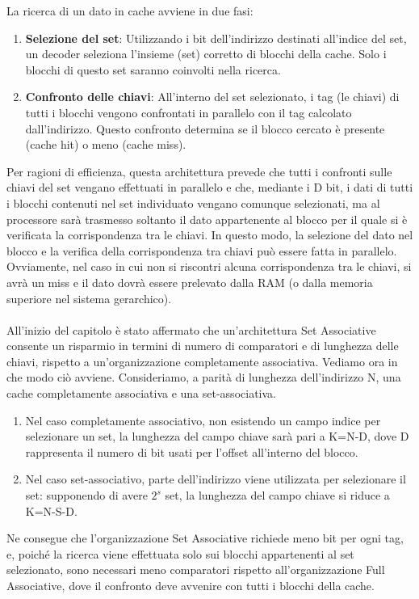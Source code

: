 La ricerca di un dato in cache avviene in due fasi: 
\begin{enumerate}
    \item \textbf{Selezione del set}: Utilizzando i bit dell'indirizzo destinati all'indice del set, un decoder seleziona l’insieme (set) corretto di blocchi della cache. Solo i blocchi di questo set saranno coinvolti nella ricerca. 
    \item \textbf{Confronto delle chiavi}: All'interno del set selezionato, i tag (le chiavi) di tutti i blocchi vengono confrontati in parallelo con il tag calcolato dall’indirizzo. Questo confronto determina se il blocco cercato è presente (cache hit) o meno (cache miss).
\end{enumerate}
Per ragioni di efficienza, questa architettura prevede che tutti i confronti sulle chiavi del set vengano effettuati in parallelo e che, mediante i D bit, i dati di tutti i blocchi contenuti nel set individuato vengano comunque selezionati, ma al processore sarà trasmesso soltanto il dato appartenente al blocco per il quale si è verificata la corrispondenza tra le chiavi. In questo modo, la selezione del dato nel blocco e la verifica della corrispondenza tra chiavi può essere fatta in parallelo. Ovviamente, nel caso in cui non si riscontri alcuna corrispondenza tra le chiavi, si avrà un miss e il dato dovrà essere prelevato dalla RAM (o dalla memoria superiore nel sistema gerarchico).
\\
\\
All'inizio del capitolo è stato affermato che un'architettura Set Associative consente un risparmio in termini di numero di comparatori e di lunghezza delle chiavi, rispetto a un'organizzazione completamente associativa. Vediamo ora in che modo ciò avviene. Consideriamo, a parità di lunghezza dell'indirizzo N, una cache completamente associativa e una set-associativa. 
\begin{enumerate}
    \item Nel caso completamente associativo, non esistendo un campo indice per selezionare un set, la lunghezza del campo chiave sarà pari a K=N-D, dove D rappresenta il numero di bit usati per l'offset all'interno del blocco.
    \item Nel caso set-associativo, parte dell'indirizzo viene utilizzata per selezionare il set: supponendo di avere \(2^s\) set, la lunghezza del campo chiave si riduce a K=N-S-D.
\end{enumerate}
Ne consegue che l'organizzazione Set Associative richiede meno bit per ogni tag, e, poiché la ricerca viene effettuata solo sui blocchi appartenenti al set selezionato, sono necessari meno comparatori rispetto all'organizzazione Full Associative, dove il confronto deve avvenire con tutti i blocchi della cache.
